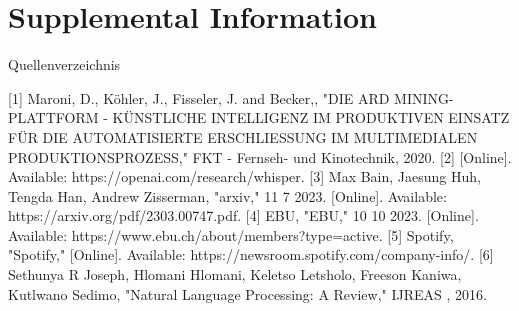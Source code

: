 \chapter{Supplemental Information}\label{app:supplemental-information}


Quellenverzeichnis


[1] 	Maroni, D., Köhler, J., Fisseler, J. and Becker,, "DIE ARD MINING-PLATTFORM - KÜNSTLICHE INTELLIGENZ IM PRODUKTIVEN EINSATZ FÜR DIE AUTOMATISIERTE ERSCHLIESSUNG IM MULTIMEDIALEN PRODUKTIONSPROZESS," FKT - Fernseh- und Kinotechnik, 2020. 
[2] 	[Online]. Available: https://openai.com/research/whisper.
[3] 	Max Bain, Jaesung Huh, Tengda Han, Andrew Zisserman, "arxiv," 11 7 2023. [Online]. Available: https://arxiv.org/pdf/2303.00747.pdf.
[4] 	EBU, "EBU," 10 10 2023. [Online]. Available: https://www.ebu.ch/about/members?type=active.
[5] 	Spotify, "Spotify," [Online]. Available: https://newsroom.spotify.com/company-info/.
[6] 	Sethunya R Joseph, Hlomani Hlomani, Keletso Letsholo, Freeson Kaniwa, Kutlwano Sedimo, "Natural Language Processing: A Review," IJREAS , 2016. 



